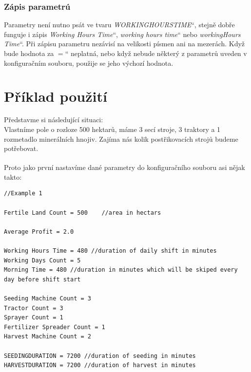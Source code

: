 \documentclass[11pt,a4paper,titlepage]{article}
\newcommand{\ceskeuvozovky}[1]{\quotedblbase#1\textquotedblleft}
\begin{document}
\subsubsection{Zápis parametrú}
Parametry není nutno psát ve tvaru \ceskeuvozovky{\emph{WORKINGHOURSTIME}}, stejně dobře funguje i zápis \ceskeuvozovky{\emph{Working Hours Time}}, \ceskeuvozovky{\emph{working hours time}} nebo \ceskeuvozovky{\emph{workingHours Time}}. Při zápisu parametru nezávisí na velikosti písmen ani na mezerách. Když bude hodnota za \ceskeuvozovky{$=$} neplatná, nebo když nebude některý z parametrů uveden v konfiguračním souboru, použije se jeho výchozí hodnota.

\section{Příklad použití}

Představme si následující situaci: \\
Vlastníme pole o rozloze 500 hektarů, máme 3 secí stroje, 3 traktory a 1 rozmetadlo minerálních hnojiv. Zajíma nás kolik postřikovacích strojů budeme potřebovat. \\ \\

Proto jako první nastavíme dané parametry do konfiguračního souboru asi nějak takto: \\

\begin{lstlisting}
//Example 1

Fertile Land Count = 500    //area in hectars

Average Profit = 2.0

Working Hours Time = 480 //duration of daily shift in minutes
Working Days Count = 5
Morning Time = 480 //duration in minutes which will be skiped every day before shift start

Seeding Machine Count = 3
Tractor Count = 3
Sprayer Count = 1
Fertilizer Spreader Count = 1
Harvest Machine Count = 2

SEEDINGDURATION = 7200 //duration of seeding in minutes
HARVESTDURATION = 7200 //duration of harvest in minutes
\end{lstlisting}


\newpage

\end{document}
